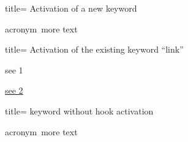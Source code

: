 \documentclass{l3doc}
\begin{document}
\begin{tcblisting}{title= Activation of a new keyword}


\makeatletter
{}acronym\hyper@linkend\ more text
\makeatother

\end{tcblisting}


\begin{tcblisting}{title= Activation of the existing keyword \enquote{link}}


\makeatletter
{}see 1\hyper@linkend
\makeatother

\hyperlink{some-target}{see 2}
\end{tcblisting}


\begin{tcblisting}{title= keyword without hook activation}

\hypersetup{linkcolor=brown,linkbordercolor=red}
\makeatletter
{}acronym\hyper@linkend\ more text
\makeatother

\end{tcblisting}
\end{document}
